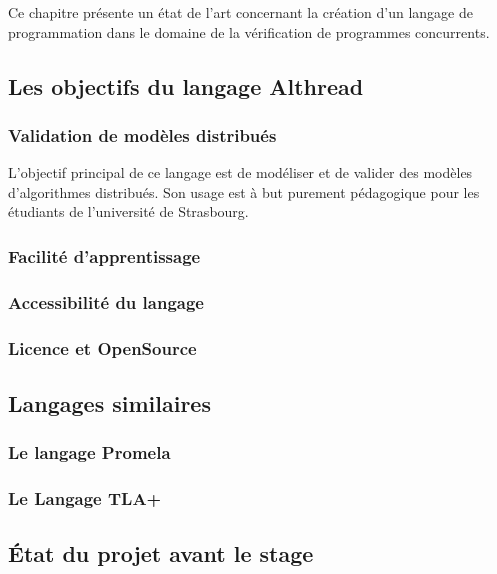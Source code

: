 
Ce chapitre présente un état de l'art concernant la création d'un langage de programmation dans le domaine de la vérification de programmes concurrents.

\subsection{Les objectifs du langage Althread}
\subsubsection{Validation de modèles distribués}
L'objectif principal de ce langage est de modéliser et de valider des modèles d'algorithmes distribués. Son usage est à but purement pédagogique pour les étudiants de l'université de Strasbourg.
\subsubsection{Facilité d'apprentissage}
\subsubsection{Accessibilité du langage}
\subsubsection{Licence et OpenSource}
\subsection{Langages similaires}
\subsubsection{Le langage Promela}
\subsubsection{Le Langage TLA+}
\subsection{État du projet avant le stage}